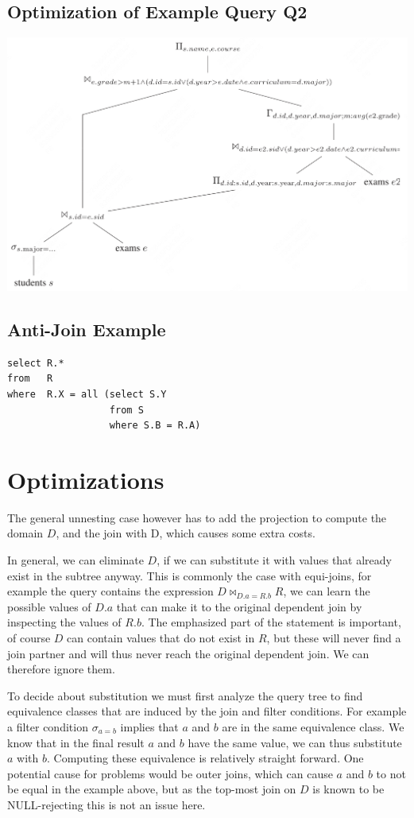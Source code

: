 \documentclass[11pt]{article}
\begin{document}
\subsection{Optimization of Example Query Q2}
\label{sec:org558d9a9}
\begin{center}
\includegraphics[width=.6\textwidth]{../../images/papers/93.png}
\end{center}
\subsection{Anti-Join Example}
\label{sec:orgca35b03}
\begin{verbatim}
select R.*
from   R
where  R.X = all (select S.Y
                  from S
                  where S.B = R.A)
\end{verbatim}
\section{Optimizations}
\label{sec:orge45611f}
The general unnesting case however has to add the projection to compute the domain \(D\), and the join
with D, which causes some extra costs.

In general, we can eliminate \(D\), if we can substitute it with values that already exist in the
subtree anyway. This is commonly the case with equi-joins, for example the query contains the
expression \(D\bowtie_{D.a=R.b}R\), we can learn the possible values of \(D.a\) that can make it to
the original dependent join by inspecting the values of \(R.b\). The emphasized part of the statement
is important, of course \(D\) can contain values that do not exist in \(R\), but these will never find
a join partner and will thus never reach the original dependent join. We can therefore ignore them.

To decide about substitution we must first analyze the query tree to find equivalence classes that are
induced by the join and filter conditions. For example a filter condition \(\sigma_{a=b}\) implies
that \(a\) and \(b\) are in the same equivalence class. We know that in the final result \(a\) and
\(b\) have the same value, we can thus substitute \(a\) with \(b\). Computing these equivalence is
relatively straight forward. One potential cause for problems would be outer joins, which can cause
\(a\) and \(b\) to not be equal in the example above, but as the top-most join on \(D\) is known to be
NULL-rejecting this is not an issue here.
\end{document}
